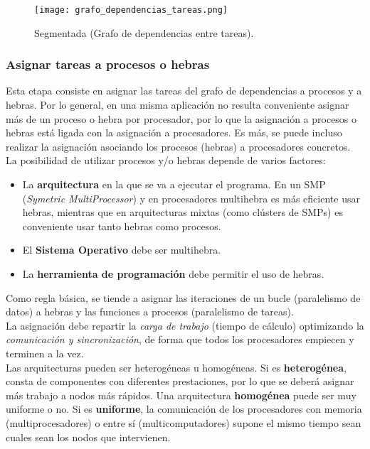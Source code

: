 \documentclass[12pt,spanish]{article}
\begin{document}
\begin{figure}[H]
	\centering
	\texttt{[image: grafo\_dependencias\_tareas.png]}
	\caption{Segmentada (Grafo de dependencias entre tareas).}
\end{figure}

\subsubsection{Asignar tareas a procesos o hebras}

Esta etapa consiste en asignar las tareas del grafo de dependencias a procesos y a hebras. Por lo general, en una misma aplicación no resulta conveniente asignar más de un proceso o hebra por procesador, por lo que la asignación a procesos o hebras está ligada con la asignación a procesadores. Es más, se puede incluso realizar la asignación asociando los procesos (hebras) a procesadores concretos.\\

La posibilidad de utilizar procesos y/o hebras depende de varios factores:

\begin{itemize}
	\item La \textbf{arquitectura} en la que se va a ejecutar el programa. En un SMP (\textit{Symetric MultiProcessor}) y en procesadores multihebra es más eficiente usar hebras, mientras que en arquitecturas mixtas (como clústers de SMPs) es conveniente usar tanto hebras como procesos.
	\item El \textbf{Sistema Operativo} debe ser multihebra.
	\item La \textbf{herramienta de programación} debe permitir el uso de hebras.
\end{itemize}
Como regla básica, se tiende a asignar las iteraciones de un bucle (paralelismo de datos) a hebras y las funciones a procesos (paralelismo de tareas).\\

La asignación debe repartir la \emph{carga de trabajo} (tiempo de cálculo) optimizando la \emph{comunicación y sincronización}, de forma que todos los procesadores empiecen y terminen a la vez.\\

Las arquitecturas pueden ser heterogéneas u homogéneas. Si es \textbf{heterogénea}, consta de componentes con diferentes prestaciones, por lo que se deberá asignar más trabajo a nodos más rápidos. Una arquitectura \textbf{homogénea} puede ser muy uniforme o no. Si es \textbf{uniforme}, la comunicación de los procesadores con memoria (multiprocesadores) o entre sí (multicomputadores) supone el mismo tiempo sean cuales sean los nodos que intervienen.\\
\end{document}
